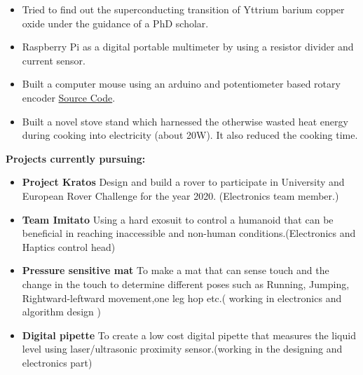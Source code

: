 \begin{itemize}
    \item Tried to find out the  superconducting transition of Yttrium barium copper oxide under the guidance of a PhD scholar.

 \item Raspberry Pi as a digital portable multimeter by using a resistor divider
  and current sensor.
 


  \item Built a computer  mouse  using an arduino and potentiometer based
   rotary encoder    \href {https://github.com/iamashwin26/Arduino-Projs/tree/master/Joystick_as_aMouse_Controller}{Source Code}.

 \item Built a novel stove stand which harnessed the otherwise  wasted heat energy 
 during cooking into electricity (about 20W). It also reduced the cooking time. 
 

\end{itemize}















\textbf{Projects currently pursuing:}
\begin{itemize}
    \item \textbf{Project Kratos} \newline
    Design and build a rover to participate in University and European Rover Challenge for the year
2020. (Electronics team member.)
    \item \textbf{Team Imitato}\newline
    Using a hard exosuit to
control a humanoid that
can be beneficial in
reaching inaccessible
and non-human
conditions.(Electronics and Haptics control head)
    \item \textbf{Pressure sensitive mat}\newline
    To make a mat that can sense touch and the change in the touch to determine different poses such as Running, Jumping, Rightward-leftward movement,one leg hop etc.( working in electronics and algorithm design ) 
   \item \textbf{Digital pipette}\newline
   To create a low cost digital pipette that measures the liquid level using laser/ultrasonic proximity sensor.(working in the designing and electronics part)
    
\end{itemize}

\\